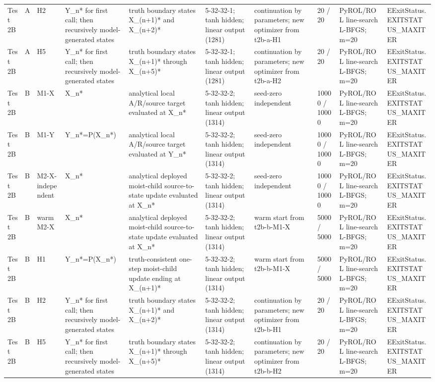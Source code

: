 \begin{tabular}{llllllllll}
Test 2B & A & H2 & Y\_n* for first call; then recursively model-generated states & truth boundary states X\_(n+1)* and X\_(n+2)* & 5-32-32-1; tanh hidden; linear output (1281) & continuation by parameters; new optimizer from t2b-a-H1 & 20 / 20 & PyROL/ROL line-search L-BFGS; m=20 & EExitStatus.EXITSTATUS\_MAXITER \\
Test 2B & A & H5 & Y\_n* for first call; then recursively model-generated states & truth boundary states X\_(n+1)* through X\_(n+5)* & 5-32-32-1; tanh hidden; linear output (1281) & continuation by parameters; new optimizer from t2b-a-H2 & 20 / 20 & PyROL/ROL line-search L-BFGS; m=20 & EExitStatus.EXITSTATUS\_MAXITER \\
Test 2B & B & M1-X & X\_n* & analytical local A/R/source target evaluated at X\_n* & 5-32-32-2; tanh hidden; linear output (1314) & seed-zero independent & 10000 / 10000 & PyROL/ROL line-search L-BFGS; m=20 & EExitStatus.EXITSTATUS\_MAXITER \\
Test 2B & B & M1-Y & Y\_n*=P(X\_n*) & analytical local A/R/source target evaluated at Y\_n* & 5-32-32-2; tanh hidden; linear output (1314) & seed-zero independent & 10000 / 10000 & PyROL/ROL line-search L-BFGS; m=20 & EExitStatus.EXITSTATUS\_MAXITER \\
Test 2B & B & M2-X-independent & X\_n* & analytical deployed moist-child source-to-state update evaluated at X\_n* & 5-32-32-2; tanh hidden; linear output (1314) & seed-zero independent & 10000 / 10000 & PyROL/ROL line-search L-BFGS; m=20 & EExitStatus.EXITSTATUS\_MAXITER \\
Test 2B & B & warm M2-X & X\_n* & analytical deployed moist-child source-to-state update evaluated at X\_n* & 5-32-32-2; tanh hidden; linear output (1314) & warm start from t2b-b-M1-X & 5000 / 5000 & PyROL/ROL line-search L-BFGS; m=20 & EExitStatus.EXITSTATUS\_MAXITER \\
Test 2B & B & H1 & Y\_n*=P(X\_n*) & truth-consistent one-step moist-child update ending at X\_(n+1)* & 5-32-32-2; tanh hidden; linear output (1314) & warm start from t2b-b-M1-X & 5000 / 5000 & PyROL/ROL line-search L-BFGS; m=20 & EExitStatus.EXITSTATUS\_MAXITER \\
Test 2B & B & H2 & Y\_n* for first call; then recursively model-generated states & truth boundary states X\_(n+1)* and X\_(n+2)* & 5-32-32-2; tanh hidden; linear output (1314) & continuation by parameters; new optimizer from t2b-b-H1 & 20 / 20 & PyROL/ROL line-search L-BFGS; m=20 & EExitStatus.EXITSTATUS\_MAXITER \\
Test 2B & B & H5 & Y\_n* for first call; then recursively model-generated states & truth boundary states X\_(n+1)* through X\_(n+5)* & 5-32-32-2; tanh hidden; linear output (1314) & continuation by parameters; new optimizer from t2b-b-H2 & 20 / 20 & PyROL/ROL line-search L-BFGS; m=20 & EExitStatus.EXITSTATUS\_MAXITER \\

\end{tabular}
